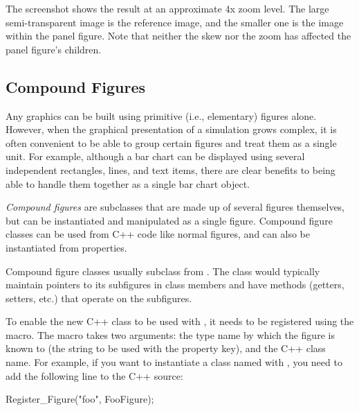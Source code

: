 
The screenshot shows the result at an approximate 4x zoom level. The large
semi-transparent image is the reference image, and the smaller one is the image within the panel
figure. Note that neither the skew nor the zoom has affected the panel figure's children.

\begin{center}

\end{center}


\subsection{Compound Figures}
\label{sec:graphics:compound-figures}

Any graphics can be built using primitive (i.e., elementary) figures
alone. However, when the graphical presentation of a simulation
grows complex, it is often convenient to be able to group certain
figures and treat them as a single unit. For example, although
a bar chart can be displayed using several independent rectangles,
lines, and text items, there are clear benefits to being able to
handle them together as a single bar chart object.

\textit{Compound figures} are  subclasses that
are made up of several figures themselves, but can be instantiated
and manipulated as a single figure. Compound figure classes
can be used from C++ code like normal figures, and can also
be instantiated from  properties.

Compound figure classes usually subclass from .
The class would typically maintain pointers to its subfigures in
class members and have methods (getters, setters, etc.) that operate
on the subfigures.

To enable the new C++ class to be used with ,
it needs to be registered using the  macro.
The macro takes two arguments: the type name by which the figure
is known to  (the string to be used with the  property key),
and the C++ class name. For example, if you want to instantiate
a class named  with ,
you need to add the following line to the C++ source:

\begin{cpp}
Register_Figure("foo", FooFigure);
\end{cpp}

